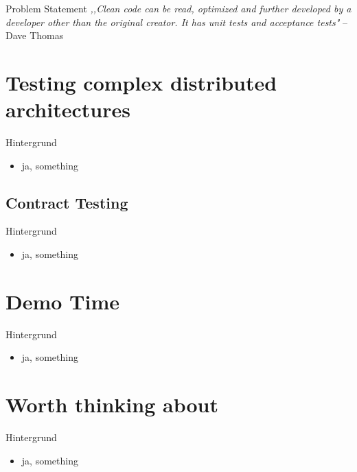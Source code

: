 	\begin{frame}{Problem Statement}
		\small{\textit{,,Clean code can be read, optimized and further developed by a developer other than the original creator. It has unit tests and acceptance tests"}} -- Dave Thomas

	\end{frame}


	


	\section{Testing complex distributed architectures}
	\begin{frame}{Hintergrund}

		\begin{itemize}
			\item ja, something
		\end{itemize}

	\end{frame}


	\subsection{Contract Testing}
	\begin{frame}{Hintergrund}

		\begin{itemize}
			\item ja, something
		\end{itemize}

	\end{frame}



	\section{Demo Time}
	\begin{frame}{Hintergrund}

		\begin{itemize}
			\item ja, something
		\end{itemize}

	\end{frame}


	\section{Worth thinking about}
	\begin{frame}{Hintergrund}

		\begin{itemize}
			\item ja, something
		\end{itemize}

	\end{frame}
%

